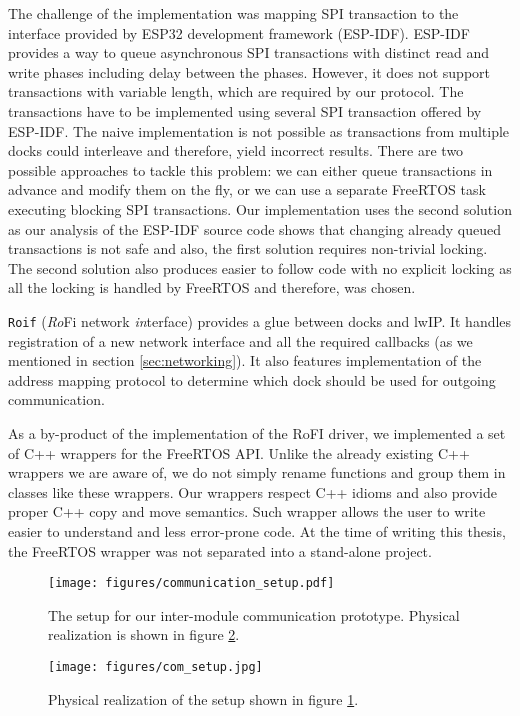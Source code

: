 The challenge of the implementation was mapping SPI transaction to the interface
provided by ESP32 development framework (ESP-IDF). ESP-IDF provides a way to
queue asynchronous SPI transactions with distinct read and write phases
including delay between the phases. However, it does not support transactions
with variable length, which are required by our protocol. The transactions have
to be implemented using several SPI transaction offered by ESP-IDF. The naive
implementation is not possible as transactions from multiple docks could
interleave and therefore, yield incorrect results. There are two possible
approaches to tackle this problem: we can either queue transactions in advance
and modify them on the fly, or we can use a separate FreeRTOS task executing
blocking SPI transactions. Our implementation uses the second solution as our
analysis of the ESP-IDF source code shows that changing already queued
transactions is not safe and also, the first solution requires non-trivial
locking. The second solution also produces easier to follow code with no
explicit locking as all the locking is handled by FreeRTOS and therefore, was
chosen.

\texttt{Roif} (\emph{Ro}Fi network \emph{in}terface) provides a glue between
docks and lwIP. It handles registration of a new network interface and all the
required callbacks (as we mentioned in section \ref{sec:networking}). It also
features implementation of the address mapping protocol to determine which dock
should be used for outgoing communication.

As a by-product of the implementation of the RoFI driver, we implemented a set
of C++ wrappers for the FreeRTOS API. Unlike the already existing C++ wrappers
we are aware of, we do not simply rename functions and group them in classes
like these wrappers. Our wrappers respect C++ idioms and also provide proper C++
copy and move semantics. Such wrapper allows the user to write easier to
understand and less error-prone code. At the time of writing this thesis, the
FreeRTOS wrapper was not separated into a stand-alone project.

\begin{figure}[!t]
    \centering
    \texttt{[image: figures/communication\_setup.pdf]}
    \caption{The setup for our inter-module communication prototype. Physical
    realization is shown in figure \ref{fig:comm_setup_p}.}
    \label{fig:comm_setup}
\end{figure}

\begin{figure}[!t]
    \centering
    \texttt{[image: figures/com\_setup.jpg]}
    \caption{Physical realization of the setup shown in figure \ref{fig:comm_setup}.}
    \label{fig:comm_setup_p}
\end{figure}

